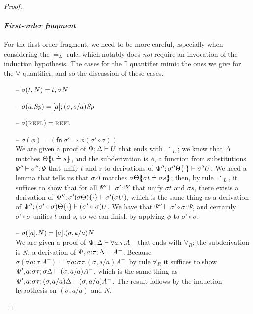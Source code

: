 \begin{proof}
\begin{itemize}
\end{itemize}

\paragraph{\it First-order fragment} For the first-order fragment, we need
to be more careful, especially when considering the 
$\doteq_L$ rule, which notably
does {\it not} require an invocation of the induction hypothesis. The cases
for the $\exists$ quantifier mimic the ones we give for the $\forall$
quantifier, and so the discussion of these cases.

\begin{itemize}

\item[--]
$\sigma({t},{N}) = {t},{\sigma{N}}$ 

\item[--]
$\sigma({a}.{{\it Sp}}) = [{a}]; {(\sigma, a/a){\it Sp}}$ 

\item[--]
$\sigma(\textsc{refl}) = \textsc{refl}$

\item[--]
$\sigma(\phi) = \left( \mathsf{fn}~\sigma' \Rightarrow \phi (\sigma'
  \circ \sigma) \right)$ \smallskip\\ We are given a proof of
${\Psi};{\Delta} \vdash {U}$ that ends with ${\doteq}_L$; we know that
$\Delta$ matches ${\Theta}\mbox{$\{\hspace{-4pt}\{$}{t \doteq s}\mbox{$\}\hspace{-4pt}\}$}$, and the
subderivation is $\phi$, a function from substitutions 
$\Psi'' \vdash \sigma'' : \Psi$ that unify $t$ and $s$ to derivations
of ${\Psi''};{{\sigma''\Theta}\{{\cdot}\}} \vdash {\sigma''{U}}$. We need a lemma
that tells us that $\sigma\Delta$ matches 
${\sigma\Theta}\mbox{$\{\hspace{-4pt}\{$}{\sigma t \doteq \sigma s}\mbox{$\}\hspace{-4pt}\}$}$; then, by rule
${\doteq}_L$, it suffices to show that for all 
$\Psi'' \vdash \sigma' : \Psi'$ that unify $\sigma t$ and $\sigma s$, 
there exists a derivation of 
${\Psi''};{{\sigma'(\sigma \Theta)}\{{\cdot}\}} \vdash {\sigma'(\sigma U)}$,
which is the same thing as a derivation of 
${\Psi''};{{(\sigma' \circ \sigma) \Theta}\{{\cdot}\}} \vdash {(\sigma' \circ \sigma) U}$. We have that 
$\Psi'' \vdash \sigma' \circ \sigma : \Psi$, and certainly 
$\sigma' \circ \sigma$ unifies $t$ and $s$, so we can finish by
applying $\phi$ to $\sigma' \circ \sigma$.\smallskip

\item[--]
$\sigma([{a}].{N}) = [{a}].{(\sigma, a/a)N}$ \smallskip\\ We are
given a proof of ${\Psi};{\Delta} \vdash {\forall a{:}\tau.A^-}$ 
that ends with $\forall_R$; the subderivation
is $N$, a derivation of ${\Psi,a{:}\tau};{\Delta} \vdash {A^-}$. Because
$\sigma(\forall{a}{:}{\tau}.A^-) 
 = \forall{a}{:}{\sigma\tau}.(\sigma, a/a){A^-}$,
by rule $\forall_R$ it suffices to show 
${\Psi', a{:}\sigma\tau};{\sigma\Delta} \vdash {(\sigma, a/a)A^-}$, 
which is the same thing
as ${\Psi', a{:}\sigma\tau};{(\sigma, a/a)\Delta} \vdash {(\sigma, a/a)A^-}$.
The result
follows by the induction hypothesis on $(\sigma, a/a)$ and $N$. \smallskip


\end{itemize}
\end{proof}

